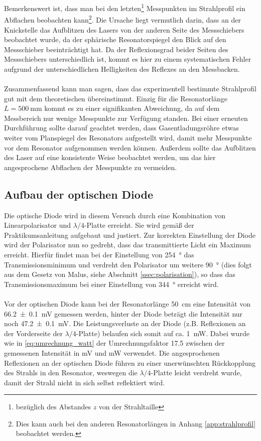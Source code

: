 \documentclass[11pt, a4paper]{article}
\numberwithin{equation}{section}
\begin{document}
Bemerkenswert ist, dass man bei den letzten\footnote{bezüglich des Abstandes $z$ von der Strahltaille} Messpunkten im Strahlprofil ein Abflachen beobachten kann\footnote{Dies kann auch bei den anderen Resonatorlängen in Anhang \ref{app:strahlprofil} beobachtet werden.}.
Die Ursache liegt vermutlich darin, dass an der Knickstelle das Aufblitzen des Lasers von der anderen Seite des Messschiebers beobachtet wurde, da der sphärische Resonatorspiegel den Blick auf den Messschieber beeinträchtigt hat.
Da der Reflexionsgrad beider Seiten des Messschiebers unterschiedlich ist, kommt es hier zu einem systematischen Fehler aufgrund der unterschiedlichen Helligkeiten des Reflexes an den Messbacken.\\
\\
Zusammenfassend kann man sagen, dass das experimentell bestimmte Strahlprofil gut mit dem theoretischen übereinstimmt.
Einzig für die Resonatorlänge $L = \SI{500}{\milli\metre}$ kommt es zu einer signifikanten Abweichung, da auf dem Messbereich nur wenige Messpunkte zur Verfügung standen.
Bei einer erneuten Durchführung sollte darauf geachtet werden, dass Gasentladungsröhre etwas weiter vom Planspiegel des Resonators aufgestellt wird, damit mehr Messpunkte vor dem Resonator aufgenommen werden können.
Außerdem sollte das Aufblitzen des Laser auf eine konsistente Weise beobachtet werden, um das hier angesprochene Abflachen der Messpunkte zu vermeiden.

\subsection{Aufbau der optischen Diode}

Die optische Diode wird in diesem Versuch durch eine Kombination von Linearpolarisator und $\lambda/4$-Platte erreicht.
Sie wird gemäß der Praktikumsanleitung aufgebaut und justiert.
Zur korrekten Einstellung der Diode wird der Polarisator nun so gedreht, dass das transmittierte Licht ein Maximum erreicht.
Hierfür findet man bei der Einstellung von \SI{254}{\degree} das Transmissionsminimum und verdreht den Polarisator um weitere \SI{90}{\degree} (dies folgt aus dem Gesetz von Malus, siehe Abschnitt \ref{ssec:polarisation}), so dass das Transmissionsmaximum bei einer Einstellung von \SI{344}{\degree} erreicht wird.\\
\\
Vor der optischen Diode kann bei der Resonatorlänge \SI{50}{\centi\metre} eine Intensität von \SI{66.2+-0.1}{\milli\volt} gemessen werden, hinter der Diode beträgt die Intensität nur noch \SI{47.2+-0.1}{\milli\volt}.
Die Leistungsverluste an der Diode (z.B. Reflexionen an der Vorderseite der $\lambda/4$-Platte) belaufen sich somit auf ca. \SI{1}{\milli\watt}.
Dabei wurde wie in \eqref{eq:umrechnung_watt} der Umrechnungsfaktor \num{17.5} zwischen der gemessenen Intensität in \si{\milli\volt} und \si{\milli\watt} verwendet.
Die angesprochenen Reflexionen an der optischen Diode führen zu einer unerwünschten Rückkopplung des Strahls in den Resonator, weswegen die $\lambda/4$-Platte leicht verdreht wurde, damit der Strahl nicht in sich selbst reflektiert wird.
\end{document}
